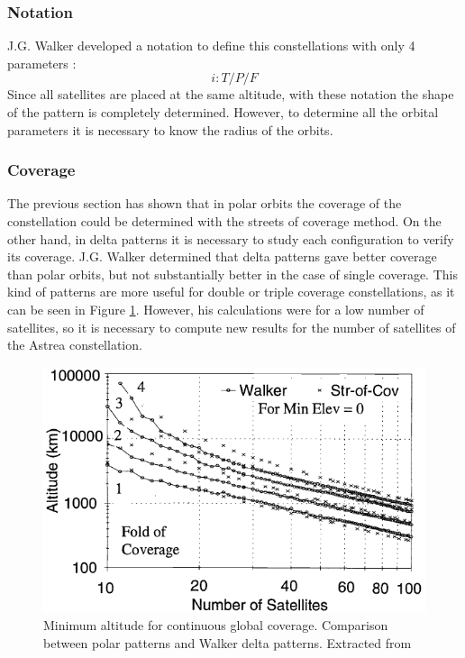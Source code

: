 \subsubsection{Notation}
J.G. Walker developed a notation to define this constellations with only 4 parameters \cite{Walker1977}:
\begin{equation*}
i: T/P/F
\end{equation*}
Since all satellites are placed at the same altitude, with these notation the shape of the pattern is completely determined. However, to determine all the orbital parameters it is necessary to know the radius of the orbits.

\subsubsection{Coverage}
The previous section has shown that in polar orbits the coverage of the constellation could be determined with the streets of coverage method. On the other hand, in delta patterns it is necessary to study each configuration to verify its coverage. J.G. Walker determined that delta patterns gave better coverage than polar orbits, but not substantially better in the case of single coverage. This kind of patterns are more useful for double or triple coverage constellations, as it can be seen in Figure \ref{fig:Walker vs. polar}. However, his calculations were for a low number of satellites, so it is necessary to compute new results for the number of satellites of the Astrea constellation.
\begin{figure}[h]
\centerline{\includegraphics[scale=0.75]{Full/foldofcoverage.png}}
\caption{Minimum altitude for continuous global coverage. Comparison between polar patterns and Walker delta patterns. Extracted from \cite{Chobotov2002}}
\label{fig:Walker vs. polar}
\end{figure}